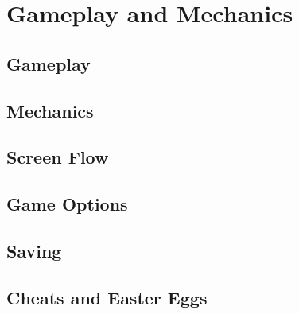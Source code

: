 \chapter{Gameplay and Mechanics}
\section{Gameplay} %
\section{Mechanics} %
\section{Screen Flow} %
\section{Game Options} %
\section{Saving} %
\section{Cheats and Easter Eggs} %
